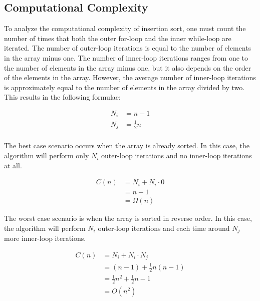 \documentclass[titlepage, a4paper, 12pt]{article}
\begin{document}
    \subsection{Computational Complexity}

    To analyze the computational complexity of insertion sort, one must count the number of times that both the outer for-loop and the inner while-loop are iterated. The number of outer-loop iterations is equal to the number of elements in the array minus one. The number of inner-loop iterations ranges from one to the number of elements in the array minus one, but it also depends on the order of the elements in the array. However, the average number of inner-loop iterations is approximately equal to the number of elements in the array divided by two. This results in the following formulae:

    \begin{equation*}
        \begin{aligned}
            N_i &= n - 1 \\
            N_j &= \frac{1}{2}n \\
        \end{aligned}
    \end{equation*}

    The best case scenario occurs when the array is already sorted. In this case, the algorithm will perform only $N_i$ outer-loop iterations and no inner-loop iterations at all.
    
    \begin{equation*}
        \begin{aligned}
            C(n) &= N_i + N_i \cdot 0 \\
            &= n - 1 \\
            &= \Omega(n)
        \end{aligned}
    \end{equation*}

    The worst case scenario is when the array is sorted in reverse order. In this case, the algorithm will perform $N_i$ outer-loop iterations and each time around $N_j$ more inner-loop iterations.
    
    \begin{equation*}
        \begin{aligned}
            C(n) &= N_i + N_i \cdot N_j \\
            &= (n - 1) + \frac{1}{2}n(n - 1) \\
            &= \frac{1}{2}n^2 + \frac{1}{2}n - 1 \\
            &= O(n^2)
        \end{aligned}
    \end{equation*}
    
\end{document}
